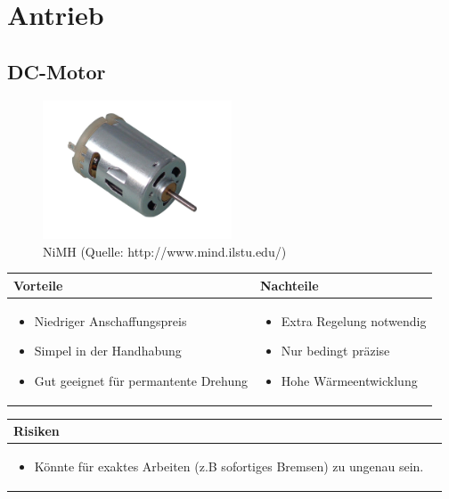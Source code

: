 
\section{Antrieb}


\subsection{DC-Motor}

\begin{figure}[h!]%
\centering
\includegraphics[width=0.5\textwidth]{fig/dcmotor.jpg}
\caption{NiMH (Quelle: http://www.mind.ilstu.edu/)}
\label{fig:Java}
\end{figure}

\begin{table}[h]
\begin{tabular}{p{} | p{}}


 \textbf{Vorteile} & \textbf{Nachteile} \\ \hline
	 
\begin{itemize}
\item Niedriger Anschaffungspreis
\item Simpel in der Handhabung
\item Gut geeignet für permantente Drehung
\end{itemize}

 
 &
 
\begin{itemize}
\item Extra Regelung notwendig
\item Nur bedingt präzise
\item Hohe Wärmeentwicklung
\end{itemize}

\end{tabular}
\end{table}

\begin{table}[h]
\begin{tabular}{p{}p{}}


 \textbf{Risiken} & \\ \hline
	 
\begin{itemize}
\item Könnte für exaktes Arbeiten (z.B sofortiges Bremsen) zu ungenau sein.
\end{itemize}

 
\end{tabular}
\end{table}


